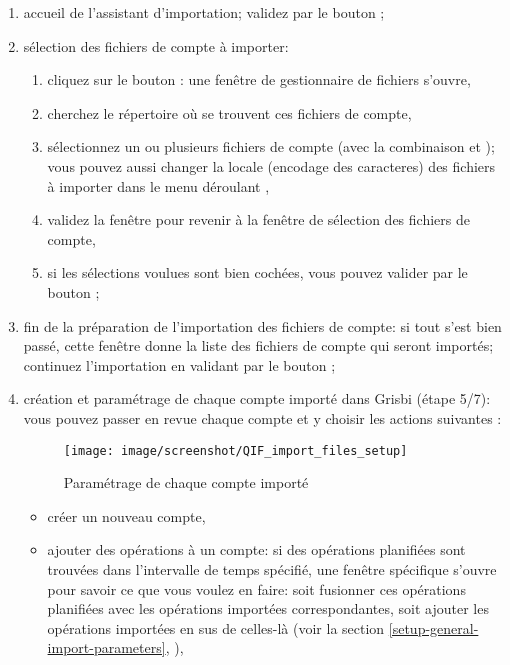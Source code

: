 \begin{enumerate}
	\item accueil de l'assistant d'importation; validez par le bouton ;
	\item sélection des fichiers de compte à importer:	
		\begin{enumerate}
			\item cliquez sur le bouton : une fenêtre de gestionnaire de fichiers s'ouvre,	
			\item cherchez le répertoire où se trouvent ces fichiers de compte,
			\item sélectionnez un ou plusieurs fichiers de compte (avec la combinaison   et ); vous pouvez aussi changer la \gls{locale} (\gls{encodage des caracteres}) des fichiers à importer dans le menu déroulant ,
			\item validez la fenêtre pour revenir à la fenêtre de sélection des fichiers de compte,
			\item si les sélections voulues sont bien cochées, vous pouvez valider par le bouton ;
		\end{enumerate}		  
	\item fin de la préparation de l'importation des fichiers de compte: si tout s'est bien passé, cette fenêtre donne la liste des fichiers de compte qui seront importés; continuez l'importation en validant par le bouton ;
	\item création et paramétrage de chaque compte importé dans Grisbi (étape 5/7): vous pouvez passer en revue chaque compte et y choisir les actions suivantes
	:
	\begin{figure}[htbp]
		\begin{center}
		\texttt{[image: image/screenshot/QIF\_import\_files\_setup]}
		\end{center}
		\caption{Paramétrage de chaque compte importé}
		\label{QIF-import-files-setup-img}
	\end{figure}
		\begin{itemize}
			\item créer un nouveau compte,
			\item ajouter des opérations à un compte: si des opérations planifiées sont trouvées dans l'intervalle de temps spécifié, une fenêtre spécifique s'ouvre pour savoir ce que vous voulez en faire: soit fusionner ces opérations planifiées avec les opérations importées correspondantes, soit ajouter les opérations importées en sus de celles-là (voir la section \vref{setup-general-import-parameters}, ),

\end{itemize}
\end{enumerate}
